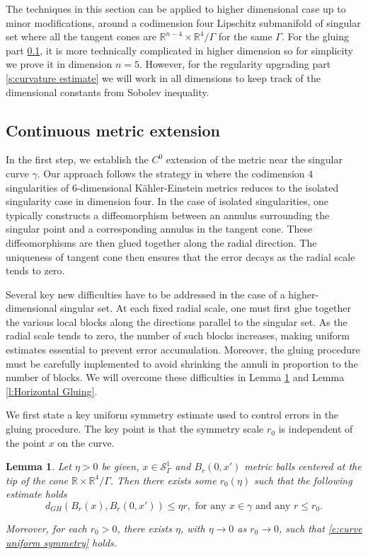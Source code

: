 \documentclass[11pt,reqno]{amsart}
\numberwithin{equation}{section}
\newcommand{\RR}{\mathds{R}}
\newtheorem{lemma}[thm]{Lemma}
\theoremstyle{definition}
\theoremstyle{remark}
\begin{document}
The techniques in this section can be applied to higher dimensional case up to minor modifications, around a codimension four Lipschitz submanifold of singular set where all the tangent cones are $\RR^{n-4} \times \RR^4/\Gamma$ for the same $\Gamma$. For the gluing part \ref{s:C0 chart}, it is more technically complicated in higher dimension so for simplicity we prove it in dimension $n=5$. However, for the regularity upgrading part \ref{s:curvature estimate} we will work in all dimensions to keep track of the dimensional constants from Sobolev inequality. 


\subsection{Continuous metric extension}\label{s:C0 chart}

In the first step, we establish the $C^0$ extension of the metric near the singular curve $\gamma$. Our approach follows the strategy in \cite{DS} where the codimension $4$ singularities of $6$-dimensional Kähler-Einstein metrics reduces to the isolated singularity case in dimension four. In the case of isolated singularities, one typically constructs a diffeomorphism between an annulus surrounding the singular point and a corresponding annulus in the tangent cone. These diffeomorphisms are then glued together along the radial direction. The uniqueness of tangent cone then ensures that the error decays as the radial scale tends to zero. 

Several key new difficulties have to be addressed in the case of a higher-dimensional singular set.  At each fixed radial scale, one must first glue together the various local blocks along the directions parallel to the singular set. As the radial scale tends to zero, the number of such blocks increases, making uniform estimates essential to prevent error accumulation. Moreover, the gluing procedure must be carefully implemented to avoid shrinking the annuli in proportion to the number of blocks. We will overcome these difficulties in Lemma \ref{l:uniform symmetry along curves} and Lemma \ref{l:Horizontal Gluing}. 


We first state a key uniform symmetry estimate used to control errors in the gluing procedure. The key point is that the symmetry scale $r_0$ is independent of the point $x$ on the curve. 

\begin{lemma}\label{l:uniform symmetry along curves}
    Let $\eta>0$ be given, $x\in \mathcal{S}^1_\Gamma$ and $B_r(0,x')$ metric balls centered at the tip of the cone $\mathbb{R}\times \mathbb{R}^4/\Gamma$. Then 
    there exists some $r_0(\eta)$ such that the following estimate holds \begin{equation}\label{e:curve uniform symmetry}
        d_{GH}(B_r(x), B_r(0,x')) \leqslant \eta r, \text{ for any } x \in \gamma \text{ and any } r \leqslant r_0.
    \end{equation}

    
Moreover, for each $r_0>0$, there exists $\eta$, with $\eta \to 0$ as $r_0\to 0$, such that \eqref{e:curve uniform symmetry} holds.
\end{lemma}
\end{document}
